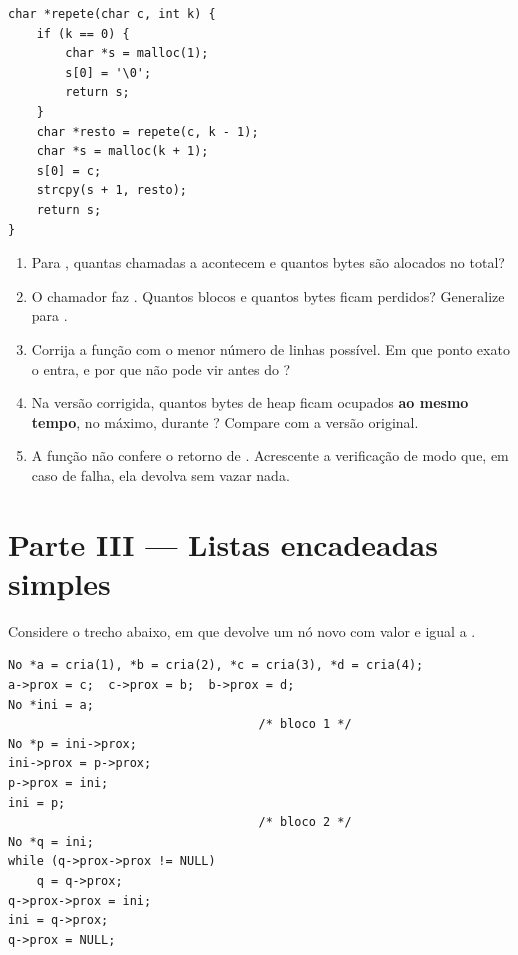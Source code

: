 \documentclass[11pt,a4paper]{article}
\begin{document}
\begin{lstlisting}
char *repete(char c, int k) {
    if (k == 0) {
        char *s = malloc(1);
        s[0] = '\0';
        return s;
    }
    char *resto = repete(c, k - 1);
    char *s = malloc(k + 1);
    s[0] = c;
    strcpy(s + 1, resto);
    return s;
}
\end{lstlisting}

\begin{enumerate}[label=(\alph*),leftmargin=1.8em,itemsep=1pt]
  \item Para , quantas chamadas a  acontecem e quantos
        bytes são alocados no total?
  \item O chamador faz .
        Quantos blocos e quantos bytes ficam perdidos? Generalize para .
  \item Corrija a função com o menor número de linhas possível. Em que ponto exato
        o  entra, e por que não pode vir antes do ?
  \item Na versão corrigida, quantos bytes de heap ficam ocupados \textbf{ao mesmo
        tempo}, no máximo, durante ? Compare com a versão
        original.
  \item A função não confere o retorno de . Acrescente a verificação de
        modo que, em caso de falha, ela devolva  sem vazar nada.
\end{enumerate}

\section{Parte III --- Listas encadeadas simples}

Considere o trecho abaixo, em que  devolve um nó novo com valor  e
 igual a .

\begin{lstlisting}
No *a = cria(1), *b = cria(2), *c = cria(3), *d = cria(4);
a->prox = c;  c->prox = b;  b->prox = d;
No *ini = a;
                                   /* bloco 1 */
No *p = ini->prox;
ini->prox = p->prox;
p->prox = ini;
ini = p;
                                   /* bloco 2 */
No *q = ini;
while (q->prox->prox != NULL)
    q = q->prox;
q->prox->prox = ini;
ini = q->prox;
q->prox = NULL;
\end{lstlisting}
\end{document}
